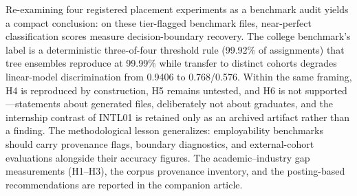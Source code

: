 \documentclass[journal]{IEEEtran}
\begin{document}
Re-examining four registered placement experiments as a benchmark audit yields a compact conclusion: on these tier-flagged benchmark files, near-perfect classification scores measure decision-boundary recovery. The college benchmark's label is a deterministic three-of-four threshold rule (99.92\% of assignments) that tree ensembles reproduce at 99.99\% while transfer to distinct cohorts degrades linear-model discrimination from 0.9406 to 0.768/0.576. Within the same framing, H4 is reproduced by construction, H5 remains untested, and H6 is not supported---statements about generated files, deliberately not about graduates, and the internship contrast of INTL01 is retained only as an archived artifact rather than a finding. The methodological lesson generalizes: employability benchmarks should carry provenance flags, boundary diagnostics, and external-cohort evaluations alongside their accuracy figures. The academic--industry gap measurements (H1--H3), the corpus provenance inventory, and the posting-based recommendations are reported in the companion article.

\FloatBarrier



\end{document}
